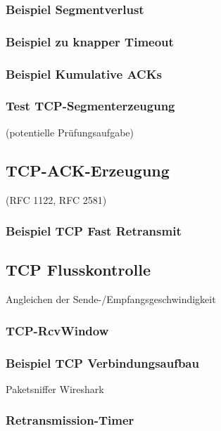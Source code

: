 \subsubsection{Beispiel Segmentverlust}
\subsubsection{Beispiel zu knapper Timeout}
\subsubsection{Beispiel Kumulative ACKs}

\subsubsection{Test TCP-Segmenterzeugung}
(potentielle Prüfungsaufgabe)

\subsection{TCP-ACK-Erzeugung}
(RFC 1122, RFC 2581)
\subsubsection{Beispiel TCP Fast Retransmit}

\subsection{TCP Flusskontrolle}
Angleichen der Sende-/Empfangsgeschwindigkeit
\subsubsection{TCP-RcvWindow}
\subsubsection{Beispiel TCP Verbindungsaufbau}
Paketsniffer Wireshark
\subsubsection{Retransmission-Timer}
